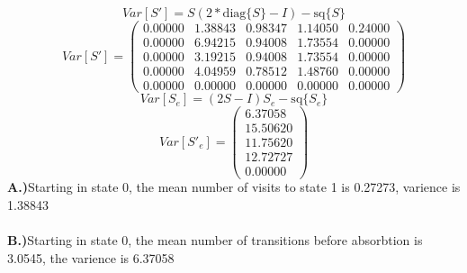 \documentclass{article}
\begin{document}
 \[Var[S'] = S(2*\mbox{diag}\{S\} - I) - \mbox{sq}\{S\}\] 
 \[Var[S'] = \left(\begin{array}{rrrrr}
   0.00000 & 1.38843 & 0.98347 & 1.14050 & 0.24000 \\
   0.00000 & 6.94215 & 0.94008 & 1.73554 & 0.00000 \\ 
   0.00000 & 3.19215 & 0.94008 & 1.73554 & 0.00000 \\
   0.00000 & 4.04959 & 0.78512 & 1.48760 & 0.00000 \\
   0.00000 & 0.00000 & 0.00000 & 0.00000 & 0.00000 
 \end{array}\right)\]
 \[Var[S_e] = (2S - I)S_e - \mbox{sq}\{S_e\}\]
 \[Var[S'_e] = \left(\begin{array}{r}
    6.37058\\
   15.50620\\
   11.75620\\ 
   12.72727\\
    0.00000 
  \end{array}\right)\]
  \textbf{A.)}Starting in state 0, the mean number of visits to state 1 is
  0.27273, varience is 1.38843 
 \\
 \\\textbf{B.)}Starting in state 0, the mean number of transitions
  before absorbtion is 3.0545, the varience is 6.37058
  
  
\end{document}
